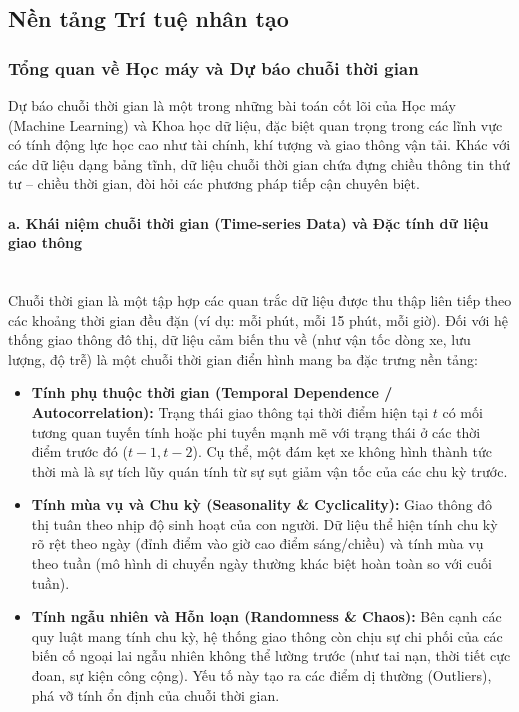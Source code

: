 \subsection{Nền tảng Trí tuệ nhân tạo}
\label{sec:3_2}

\subsubsection{Tổng quan về Học máy và Dự báo chuỗi thời gian}
Dự báo chuỗi thời gian là một trong những bài toán cốt lõi của Học máy (Machine Learning) và Khoa học dữ liệu, đặc biệt quan trọng trong các lĩnh vực có tính động lực học cao như tài chính, khí tượng và giao thông vận tải. Khác với các dữ liệu dạng bảng tĩnh, dữ liệu chuỗi thời gian chứa đựng chiều thông tin thứ tư – chiều thời gian, đòi hỏi các phương pháp tiếp cận chuyên biệt.

\paragraph{a. Khái niệm chuỗi thời gian (Time-series Data) và Đặc tính dữ liệu giao thông} \mbox{} \\
Chuỗi thời gian là một tập hợp các quan trắc dữ liệu được thu thập liên tiếp theo các khoảng thời gian đều đặn (ví dụ: mỗi phút, mỗi 15 phút, mỗi giờ). Đối với hệ thống giao thông đô thị, dữ liệu cảm biến thu về (như vận tốc dòng xe, lưu lượng, độ trễ) là một chuỗi thời gian điển hình mang ba đặc trưng nền tảng:
\begin{itemize}
    \item \textbf{Tính phụ thuộc thời gian (Temporal Dependence / Autocorrelation):} Trạng thái giao thông tại thời điểm hiện tại $t$ có mối tương quan tuyến tính hoặc phi tuyến mạnh mẽ với trạng thái ở các thời điểm trước đó ($t-1, t-2$). Cụ thể, một đám kẹt xe không hình thành tức thời mà là sự tích lũy quán tính từ sự sụt giảm vận tốc của các chu kỳ trước.
    \item \textbf{Tính mùa vụ và Chu kỳ (Seasonality \& Cyclicality):} Giao thông đô thị tuân theo nhịp độ sinh hoạt của con người. Dữ liệu thể hiện tính chu kỳ rõ rệt theo ngày (đỉnh điểm vào giờ cao điểm sáng/chiều) và tính mùa vụ theo tuần (mô hình di chuyển ngày thường khác biệt hoàn toàn so với cuối tuần).
    \item \textbf{Tính ngẫu nhiên và Hỗn loạn (Randomness \& Chaos):} Bên cạnh các quy luật mang tính chu kỳ, hệ thống giao thông còn chịu sự chi phối của các biến cố ngoại lai ngẫu nhiên không thể lường trước (như tai nạn, thời tiết cực đoan, sự kiện công cộng). Yếu tố này tạo ra các điểm dị thường (Outliers), phá vỡ tính ổn định của chuỗi thời gian.
\end{itemize}

